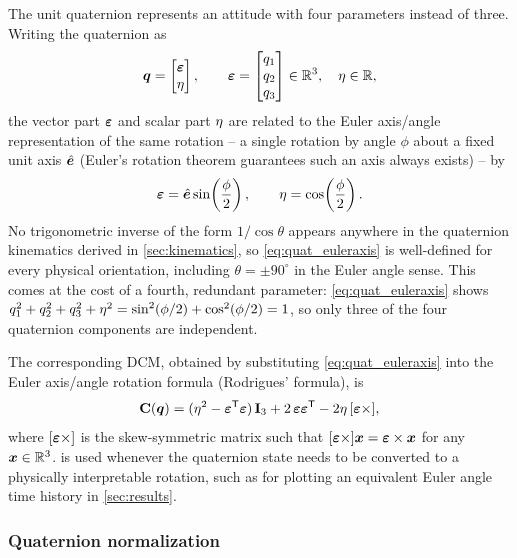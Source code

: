 The unit quaternion represents an attitude with four parameters instead of three. Writing the quaternion as
\begin{equation}
    \bm{q} = \begin{bmatrix} \bm{\varepsilon} \\ \eta \end{bmatrix}, \qquad
    \bm{\varepsilon} = \begin{bmatrix} q_1 \\ q_2 \\ q_3\end{bmatrix} \in \mathbb{R}^3, \quad \eta \in \mathbb{R},
    \label{eq:quat_def}
\end{equation}
the vector part $\bm{\varepsilon}$ and scalar part $\eta$ are related to the Euler axis/angle representation of the same rotation -- a single rotation by angle $\phi$ about a fixed unit axis $\hat{\bm{e}}$ (Euler's rotation theorem guarantees such an axis always exists) -- by
\begin{equation}
    \bm{\varepsilon} = \hat{\bm{e}}\sin\!\left(\frac{\phi}{2}\right), \qquad \eta = \cos\!\left(\frac{\phi}{2}\right).
    \label{eq:quat_euleraxis}
\end{equation}
No trigonometric inverse of the form $1/\cos\theta$ appears anywhere in the quaternion kinematics derived in \cref{sec:kinematics}, so \cref{eq:quat_euleraxis} is well-defined for every physical orientation, including $\theta = \pm90^\circ$ in the Euler angle sense. This comes at the cost of a fourth, redundant parameter: \cref{eq:quat_euleraxis} shows $q_1^2+q_2^2+q_3^2+\eta^2 = \sin^2(\phi/2) + \cos^2(\phi/2) = 1$, so only three of the four quaternion components are independent.

The corresponding DCM, obtained by substituting \cref{eq:quat_euleraxis} into the Euler axis/angle rotation formula (Rodrigues' formula), is
\begin{equation}
    \mathbf{C}(\bm{q}) = (\eta^2 - \bm{\varepsilon}^{\mathsf{T}}\bm{\varepsilon})\,\mathbf{I}_3 + 2\,\bm{\varepsilon}\bm{\varepsilon}^{\mathsf{T}} - 2\eta\,[\bm{\varepsilon}\times],
    \label{eq:quat_to_dcm}
\end{equation}
where $[\bm{\varepsilon}\times]$ is the skew-symmetric matrix such that $[\bm{\varepsilon}\times]\bm{x} = \bm{\varepsilon}\times\bm{x}$ for any $\bm{x}\in\mathbb{R}^3$.  is used whenever the quaternion state needs to be converted to a physically interpretable rotation, such as for plotting an equivalent Euler angle time history in \cref{sec:results}.

\subsubsection{Quaternion normalization}

